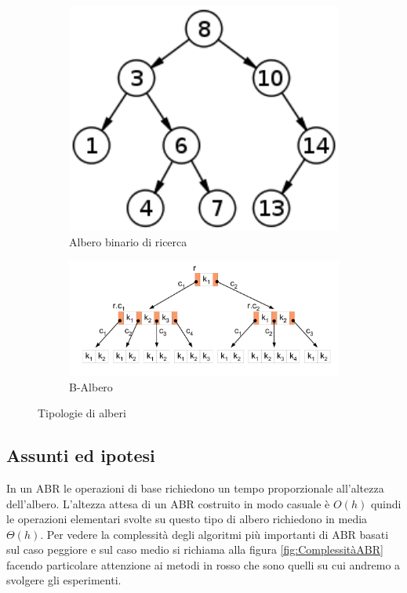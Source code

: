 \begin{figure}[H]
    \centering
    \begin{subfigure}[H]{0.35\textwidth}
        \centering
        \includegraphics[width=1\textwidth]{Images/ABR.png}
        \caption{Albero binario di ricerca}
        \label{fig:ABR}
    \end{subfigure}
    \hfill
    \begin{subfigure}[H]{0.6\textwidth}
        \centering
        \includegraphics[width=1\textwidth]{Images/BA.png}
        \caption{B-Albero}
        \label{fig:BA}
    \end{subfigure}
    \caption{Tipologie di alberi}
\end{figure}

\subsection{Assunti ed ipotesi}
\label{sec:AssuntiEdIpotesi_1}
In un ABR le operazioni di base richiedono un tempo proporzionale all'altezza dell'albero. L'altezza attesa di un ABR costruito in modo casuale è $O(h)$ quindi le operazioni elementari svolte su questo tipo di albero richiedono in media $\Theta(h)$. Per vedere la complessità degli algoritmi più importanti di ABR basati sul caso peggiore e sul caso medio si richiama alla figura \ref{fig:ComplessitàABR} facendo particolare attenzione ai metodi in rosso che sono quelli su cui andremo a svolgere gli esperimenti.

